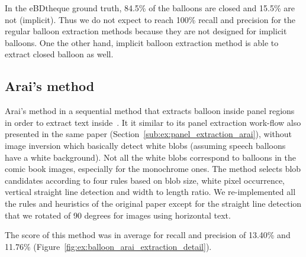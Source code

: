 In the eBDtheque ground truth, 84.5\% of the balloons are closed and 15.5\% are not (implicit).
Thus we do not expect to reach 100\% recall and precision for the regular balloon extraction methods because they are not designed for implicit balloons.
One the other hand, implicit balloon extraction method is able to extract closed balloon as well.



\subsection{Arai's method} %
\label{sub:ex:balloon_extraction_arai}

Arai's method in a sequential method that extracts balloon inside panel regions in order to extract text inside~\cite{Arai11}.
It it similar to its panel extraction work-flow also presented in the same paper (Section~\ref{sub:ex:panel_extraction_arai}), without image inversion which basically detect white blobs (assuming speech balloons have a white background).
Not all the white blobs correspond to balloons in the comic book images, especially for the monochrome ones.
The method selects blob candidates according to four rules based on blob size, white pixel occurrence, vertical straight line detection and width to length ratio.
We re-implemented all the rules and heuristics of the original paper except for the straight line detection that we rotated of 90 degrees for images using horizontal text.

The score of this method was in average for recall and precision of 13.40\% and 11.76\% (Figure~\ref{fig:ex:balloon_arai_extraction_detail}).



